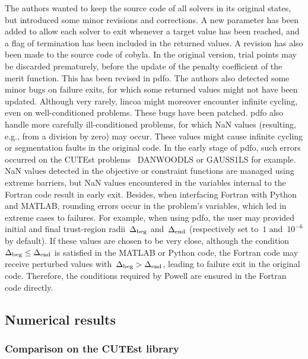 \documentclass[11pt,draft]{article}
\numberwithin{equation}{section}
\newcommand{\rad}[1][k]{\Delta\ifthenelse{\equal{#1}{}}{}{_{#1}}}
\begin{document}
The authors wanted to keep the source code of all solvers in its original states, but introduced some minor revisions and corrections.
A new parameter has been added to allow each solver to exit whenever a target value has been reached, and a flag of termination has been included in the returned values.
A revision has also been made to the source code of \gls{cobyla}.
In the original version, trial points may be discarded prematurely, before the update of the penalty coefficient of the merit function.
This has been revised in \gls{pdfo}.
The authors also detected some minor bugs on failure exits, for which some returned values might not have been updated.
Although very rarely, \gls{lincoa} might moreover encounter infinite cycling, even on well-conditioned problems.
These bugs have been patched.
\Gls{pdfo} also handle more carefully ill-conditioned problems, for which NaN values (resulting, e.g., from a division by zero) may occur.
These values might cause infinite cycling or segmentation faults in the original code.
In the early stage of \gls{pdfo}, such errors occurred on the CUTEst problems~\cite{Gould_Orban_Toint_2015} DANWOODLS or GAUSS1LS for example.
NaN values detected in the objective or constraint functions are managed using extreme barriers, but NaN values encountered in the variables internal to the Fortran code result in early exit.
Besides, when interfacing Fortran with Python and MATLAB, rounding errors occur in the problem's variables, which led in extreme cases to failures.
For example, when using \gls{pdfo}, the user may provided initial and final trust-region radii~$\rad[\text{beg}]$ and~$\rad[\text{end}]$ (respectively set to~$1$ and~$10^{-6}$ by default).
If these values are chosen to be very close, although the condition~$\rad[\text{beg}] \le \rad[\text{end}]$ is satisfied in the MATLAB or Python code, the Fortran code may receive perturbed values with~$\rad[\text{beg}] > \rad[\text{end}]$, leading to failure exit in the original code.
Therefore, the conditions required by Powell are ensured in the Fortran code directly.

\subsection{Numerical results}

\subsubsection{Comparison on the CUTEst library}
\end{document}
